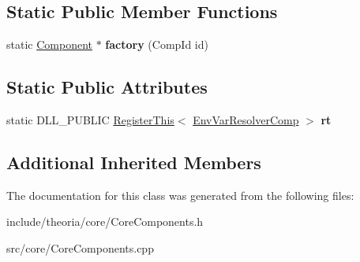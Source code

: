 \subsection*{Static Public Member Functions}
\begin{DoxyCompactItemize}
\item 
\mbox{\label{classtheoria_1_1core_1_1EnvVarResolverComp_a9e0b665ced4ddd6709af70ba5b5c98b8}} 
static \hyperlink{classtheoria_1_1core_1_1Component}{Component} $\ast$ {\bfseries factory} (Comp\+Id id)
\end{DoxyCompactItemize}
\subsection*{Static Public Attributes}
\begin{DoxyCompactItemize}
\item 
\mbox{\label{classtheoria_1_1core_1_1EnvVarResolverComp_a77207c81c25bf8870f3fe06524cae63a}} 
static D\+L\+L\+\_\+\+P\+U\+B\+L\+IC \hyperlink{classtheoria_1_1core_1_1RegisterThis}{Register\+This}$<$ \hyperlink{classtheoria_1_1core_1_1EnvVarResolverComp}{Env\+Var\+Resolver\+Comp} $>$ {\bfseries rt}
\end{DoxyCompactItemize}
\subsection*{Additional Inherited Members}


The documentation for this class was generated from the following files\+:\begin{DoxyCompactItemize}
\item 
include/theoria/core/Core\+Components.\+h\item 
src/core/Core\+Components.\+cpp\end{DoxyCompactItemize}
